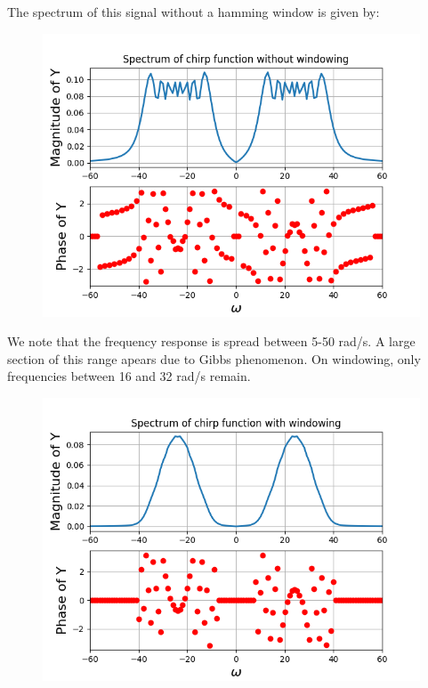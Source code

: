 \documentclass[11pt, a4paper]{article}
\begin{document}
The spectrum of this signal without a hamming window is given by:
\begin{figure}[!tbh]
\centering
\includegraphics[scale=0.7]{assgn10_plot12.png} 
\label{fig12}
\end{figure}

We note that the frequency response is spread between 5-50 rad/s. A large section of this range apears due to Gibbs phenomenon. On windowing, only frequencies between 16 and 32 rad/s remain.

\begin{figure}[!tbh]
\centering
\includegraphics[scale=0.7]{assgn10_plot13.png} 
\label{fig13}
\end{figure}
\end{document}
